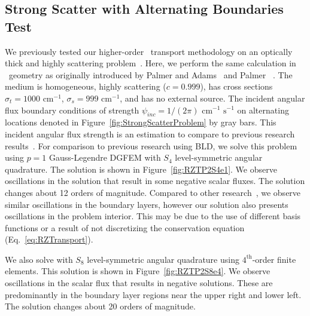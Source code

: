 \documentclass[12pt]{article}
\begin{document}
\FloatBarrier

\subsection{Strong Scatter with Alternating Boundaries Test}
\label{sec:StrongScatter}
We previously tested our higher-order \XY\ transport methodology on an optically thick and highly scattering problem~\cite{WoodsHoDgfemXyCurved}. Here, we perform the same calculation in \RZ\ geometry as originally introduced by Palmer and Adams~\cite{PalmerCurvilinearTransport} and Palmer~
\cite{PalmerDissertation}. The medium is homogeneous, highly scattering ($c=0.999$), has cross sections $\sigma_t=1000 \text{ cm}^{-1}$, $\sigma_s = 999 \text{ cm}^{-1}$, and has no external source. The incident angular flux boundary conditions of strength $\psi_{inc} = 1/(2 \pi) \text{ cm}^{-1} \text{ s}^{-1}$ on alternating locations denoted in Figure~\ref{fig:StrongScatterProblem} by gray bars. This incident angular flux strength is an estimation to compare to previous research results~\cite{PalmerCurvilinearTransport,PalmerDissertation}. For comparison to previous research using BLD, we solve this problem using $p=1$ Gauss-Legendre DGFEM with $S_4$ level-symmetric angular quadrature. The solution is shown in Figure~\ref{fig:RZTP2S4e1}. We observe oscillations in the solution that result in some negative scalar fluxes. The solution changes about 12 orders of magnitude. Compared to other research~\cite{PalmerDissertation}, we observe similar oscillations in the boundary layers, however our solution also presents oscillations in the problem interior. This may be due to the use of different basis functions or a result of not discretizing the conservation equation (Eq.~\ref{eq:RZTransport}).

We also solve with $S_8$ level-symmetric angular quadrature using $4^\text{th}$-order finite elements. This solution is shown in Figure~\ref{fig:RZTP2S8e4}. We observe oscillations in the scalar flux that results in negative solutions. These are predominantly in the boundary layer regions near the upper right and lower left. The solution changes about 20 orders of magnitude.
\end{document}
